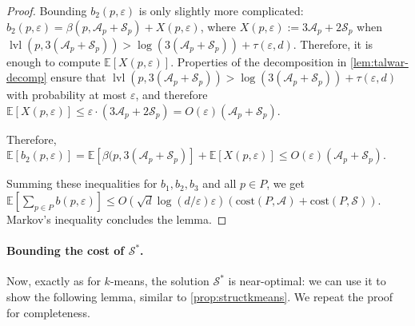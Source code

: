 \documentclass[11pt]{article}
\newcommand{\eps}{\varepsilon}
\newcommand{\cost}{\mathrm{cost}}
\newcommand{\E}{\mathbb{E}}
\newcommand{\calS}{\mathcal {S}}
\newcommand{\calL}{\mathcal{A}}
\newcommand{\badcut}{\eps}
\newcommand{\offset}{\tau(\eps, d)}
\DeclareMathOperator{\level}{lvl}
\begin{document}
\begin{proof}
Bounding $b_2(p, \eps)$ is only slightly more complicated: $b_2(p, \eps) = \beta(p, \calL_p + \calS_p) + X(p, \eps)$, where $X(p, \eps) := 3\calL_p + 2\calS_p$ when $\level(p, 3(\calL_p + \calS_p)) > \log(3(\calL_p + \calS_p)) + \offset$. 
Therefore, it is enough to compute $\E[X(p, \eps)]$.
Properties of the decomposition in \cref{lem:talwar-decomp} ensure that $\level(p, 3(\calL_p + \calS_p)) > \log(3(\calL_p + \calS_p)) + \offset$ with probability at most $\badcut$, and therefore $\E[X(p, \eps)] \leq \badcut \cdot (3\calL_p + 2\calS_p) = O(\eps)(\calL_p + \calS_p)$. 

Therefore, $\E[b_2(p, \eps)] = \E[\beta(p, 3(\calL_p + \calS_p)] + \E[X(p, \eps)] \leq O(\eps)(\calL_p + \calS_p)$.

Summing these inequalities for $b_1, b_2, b_3$ and all $p\in P$, we get $\E[\sum_{p \in P} b(p, \eps)] \leq O(\sqrt{d}\log(d/\eps)\eps)(\cost(P, \calL) + \cost(P, \calS))$. Markov's inequality concludes the lemma.
\end{proof}


\paragraph{Bounding the cost of $\calS^*$.}


Now, exactly as for $k$-means, the solution $\calS^*$ is near-optimal: we can use it to show the following lemma, similar to \cref{prop:structkmeans}. We repeat the proof for completeness.
\end{document}
